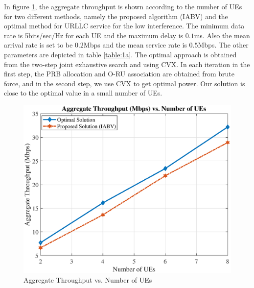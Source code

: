 \documentclass[conference]{IEEEtran}
\begin{document}
In figure \ref{fig:12}, the aggregate throughput is shown according to the number of UEs for two different methods, namely the
proposed algorithm (IABV) and the optimal method for URLLC service for the low interference.
The minimum data rate is 5bits/sec/Hz for each UE and the maximum delay is $0.1$ms.
Also the mean arrival rate is set to be $0.2$Mbps and the mean service rate is $0.5$Mbps.
The other parameters are depicted in table \ref{table:1a}.
The optimal approach is obtained from the two-step joint exhaustive search and using CVX. 
In each iteration in the first step, the PRB allocation and O-RU association are obtained from brute force, and in the second step, we use CVX to get optimal power.
Our solution is close to the optimal value in a small number of UEs.
\begin{figure}
  \centering 
    \includegraphics[scale = 0.4]{optimal1.eps}
  \caption{Aggregate Throughput vs. Number of UEs }
  \label{fig:12}
\end{figure}
\end{document}
